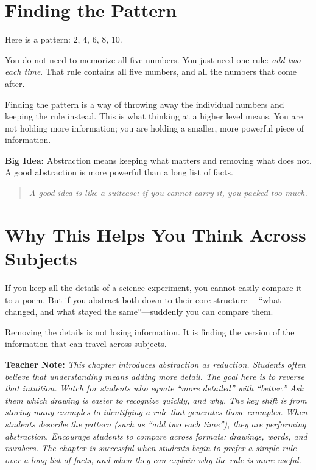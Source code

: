 \documentclass[12pt]{book}
\newenvironment{teachernote}
{\par\medskip\noindent\textbf{Teacher Note:} \itshape}
{\par\medskip}
\begin{document}
\section{Finding the Pattern}

Here is a pattern: 2, 4, 6, 8, 10.

You do not need to memorize all five numbers. You just need one rule:
\emph{add two each time}. That rule contains all five numbers, and all the
numbers that come after.

Finding the pattern is a way of throwing away the individual numbers and
keeping the rule instead. This is what thinking at a higher level means.
You are not holding more information; you are holding a smaller, more
powerful piece of information.

\textbf{Big Idea:} Abstraction means keeping what matters and removing
what does not. A good abstraction is more powerful than a long list of
facts.

\begin{quote}\itshape
A good idea is like a suitcase:
if you cannot carry it, you packed too much.
\end{quote}

\section{Why This Helps You Think Across Subjects}

If you keep all the details of a science experiment, you cannot easily
compare it to a poem. But if you abstract both down to their core structure---
``what changed, and what stayed the same''---suddenly you can compare them.

Removing the details is not losing information. It is finding the version
of the information that can travel across subjects.

\begin{teachernote}
This chapter introduces abstraction as reduction. Students often believe
that understanding means adding more detail. The goal here is to reverse
that intuition. Watch for students who equate ``more detailed'' with
``better.'' Ask them which drawing is easier to recognize quickly, and
why. The key shift is from storing many examples to identifying a rule
that generates those examples. When students describe the pattern (such
as ``add two each time''), they are performing abstraction. Encourage
students to compare across formats: drawings, words, and numbers. The
chapter is successful when students begin to prefer a simple rule over
a long list of facts, and when they can explain why the rule is more
useful.
\end{teachernote}
\end{document}
